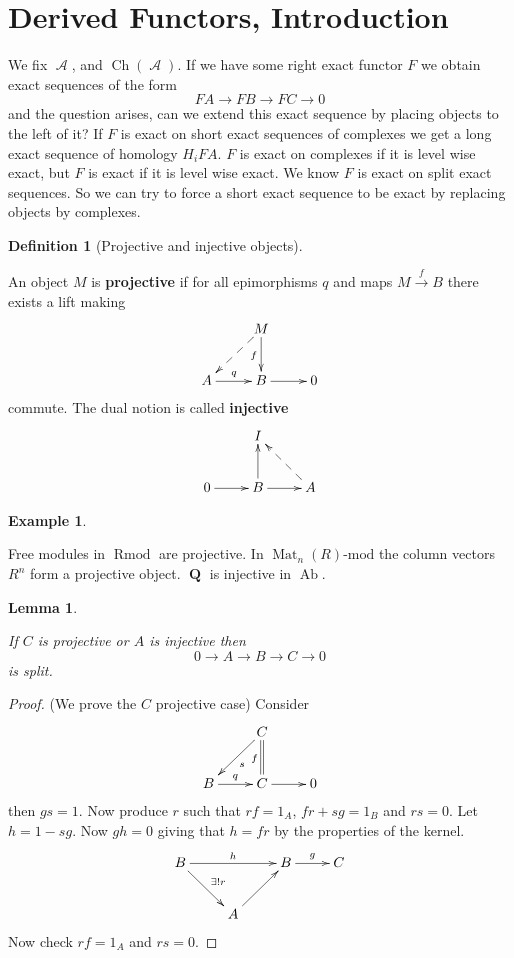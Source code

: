 \documentclass[10pt,]{book}
\newcommand{\terminology}[1]{\textbf{#1}}
\theoremstyle{plain}
\newtheorem{lemma}[theorem]{Lemma}
\theoremstyle{definition}
\newtheorem{definition}[theorem]{Definition}
\newtheorem{example}[theorem]{Example}
\numberwithin{equation}{section}
\DeclareMathOperator{\Ch}{Ch}
\DeclareMathOperator{\Ab}{\text{Ab}}
\DeclareMathOperator{\Rmod}{R\text{mod}}
\DeclareMathOperator{\cA}{\mathcal{A}}
\DeclareMathOperator{\Mat}{Mat}
\DeclareMathOperator{\QQ}{\mathbf{Q}}
\begin{document}
\section[Derived Functors, Introduction]{Derived Functors, Introduction}\label{sec-derived-intro}

          We fix \(\cA\), and \(\Ch(\cA)\).
          If we have some right exact functor \(F\) we obtain exact sequences of the form
          \[FA \to FB \to FC \to 0\]
          and the question arises, can we extend this exact sequence by placing objects to the left of it?\newline{}
          If \(F\) is exact on short exact sequences of complexes we get a long exact sequence of homology \(H_iFA\).
          \(F\) is exact on complexes if it is level wise exact, but \(F\) is exact if it is level wise exact.
          We know \(F\) is exact on split exact sequences.
          So we can try to force a short exact sequence to be exact by replacing objects by complexes.
\begin{definition}[Projective and injective objects]\label{definition-17}

            An object \(M\) is \terminology{projective} if for all epimorphisms \(q\) and maps \(M \xrightarrow{f} B\) there exists a lift making
            \[
              \xymatrix{ & M \ar[d]_f \ar@{-->}[dl]&\\
              A \ar[r]^q &B \ar[r] & 0}
            \]
            commute.
            The dual notion is called \terminology{injective}\[
              \xymatrix{ & I&\\
              0 \ar[r] &B \ar[u] \ar[r] & A  \ar@{-->}[ul]}
            \]\end{definition}
\begin{example}\label{example-9}

            Free modules in \(\Rmod\) are projective.
            In \(\Mat_n(R)\text{-mod}\) the column vectors \(R^n\) form a projective object.
            \(\QQ\) is injective in \(\Ab\).
          \end{example}
\begin{lemma}\label{lemma-proj-inj-split}

            If \(C\) is projective or \(A\) is injective then
            \[
              0 \to A \to B \to C \to 0
            \]
            is split.
          \end{lemma}
\begin{proof}

            (We prove the \(C\) projective case) Consider 
            \[
              \xymatrix{ & C \ar@{=}[d]_f \ar[dl]^s&\\
              B \ar[r]^q &C \ar[r] & 0}
            \]
            then \(gs = 1\).
            Now produce \(r\) such that \(rf = 1_A\), \(fr + sg = 1_B\) and \(rs = 0\).
            Let \(h  = 1 -sg\).
            Now \(gh = 0\) giving that \(h = fr\) by the properties of the kernel.
            \[
              \xymatrix{B \ar[rr]^h\ar[rd]^{\exists ! r} &&B \ar[r]^g &C \\ & A \ar[ur] &}
            \]
            Now check \(rf = 1_A\) and \(rs = 0\).
          \end{proof}
\end{document}
